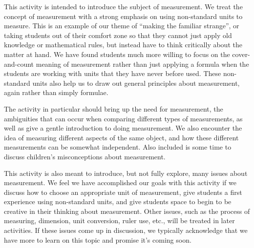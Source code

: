 \documentclass[nooutcomes]{ximera}
\begin{document}
\begin{instructorNotes}

This activity is intended to introduce the subject of measurement. We treat the concept of measurement with a strong emphasis on using non-standard units to measure.  This is an example of our theme of ``making the familiar strange'', or taking students out of their comfort zone so that they cannot just apply old knowledge or mathematical rules, but instead have to think critically about the matter at hand.  We have found students much more willing to focus on the cover-and-count meaning of measurement rather than just applying a formula when the students are working with units that they have never before used.  These non-standard units also help us to draw out general principles about measurement, again rather than simply formulae.

The activity in particular should bring up the need for measurement, the ambiguities that can occur when comparing different types of measurements, as well as give a gentle introduction to doing measurement.  We also encounter the idea of measuring different aspects of the same object, and how these different measurements can be somewhat independent.  Also included is some time to discuss children's misconceptions about measurement.

This activity is also meant to introduce, but not fully explore, many issues about measurement.  We feel we have accomplished our goals with this activity if we discuss how to choose an appropriate unit of measurement, give students a first experience using non-standard units, and give students space to begin to be creative in their thinking about measurement. Other issues, such as the process of measuring, dimension, unit conversion, ruler use, etc., will be treated in later activities.  If these issues come up in discussion, we typically acknowledge that we have more to learn on this topic and promise it's coming soon.


\end{instructorNotes}
\end{document}
